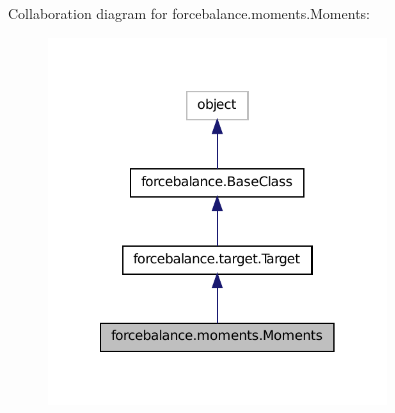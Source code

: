 Collaboration diagram for forcebalance.\-moments.\-Moments\-:
\nopagebreak
\begin{figure}[H]
\begin{center}
\leavevmode
\includegraphics[width=254pt]{classforcebalance_1_1moments_1_1Moments__coll__graph}
\end{center}
\end{figure}
